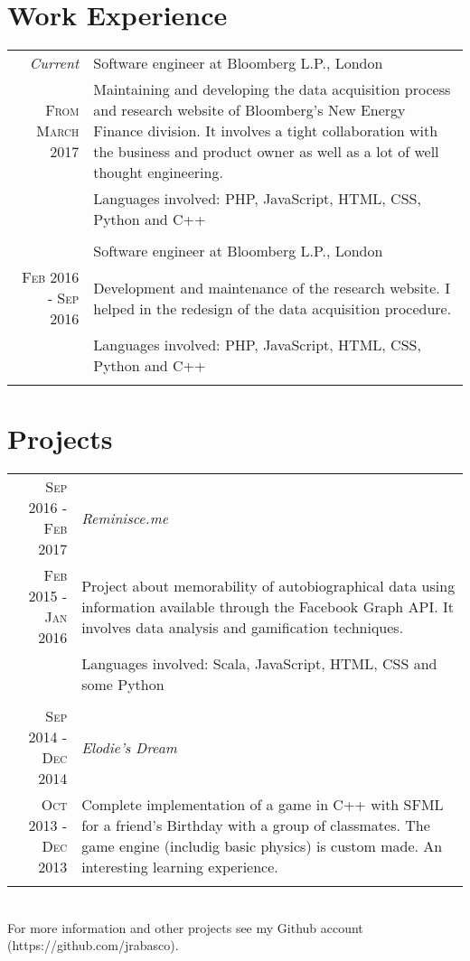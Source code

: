 \documentclass[a4paper,10pt]{article}
\begin{document}
\section{Work Experience}
\begin{tabular}{r|p{11cm}}
	\emph{Current} & \large{Software engineer at Bloomberg L.P., London} \\
	\textsc{From March 2017}&\footnotesize{Maintaining and developing the data acquisition process and research website of Bloomberg's New Energy Finance division. It involves a tight collaboration with the business and product owner as well as a lot of well thought engineering.}\\
	&\footnotesize{Languages involved: PHP, JavaScript, HTML, CSS, Python and C++}\\\multicolumn{2}{c}{} \\
	& \large{Software engineer at Bloomberg L.P., London} \\
	\textsc{Feb 2016 - Sep 2016}&\footnotesize{Development and maintenance of the research website. I helped in the redesign of the data acquisition procedure.}\\
	&\footnotesize{Languages involved: PHP, JavaScript, HTML, CSS, Python and C++}\\\multicolumn{2}{c}{} \\
\end{tabular}

\section{Projects}
\begin{tabular}{r|p{11cm}}
	\textsc{Sep 2016 - Feb 2017}&\emph{Reminisce.me} \\
	\textsc{Feb 2015 - Jan 2016}&\footnotesize{Project about memorability of autobiographical data using information
	available through the Facebook Graph API. It involves data analysis and gamification techniques.} \\
	&\footnotesize{Languages involved: Scala, JavaScript, HTML, CSS and some Python}\\\multicolumn{2}{c}{} \\
	\textsc{Sep 2014 - Dec 2014}&\emph{Elodie's Dream} \\
	\textsc{Oct 2013 - Dec 2013}&\footnotesize{Complete implementation of a game in C++ with SFML for a friend's Birthday with a group of classmates. The game engine (includig basic physics) is custom made. An interesting learning experience.}\\\multicolumn{2}{c}{} \\
\end{tabular}\\
For more information and other projects see my Github account (https://github.com/jrabasco).
\end{document}
